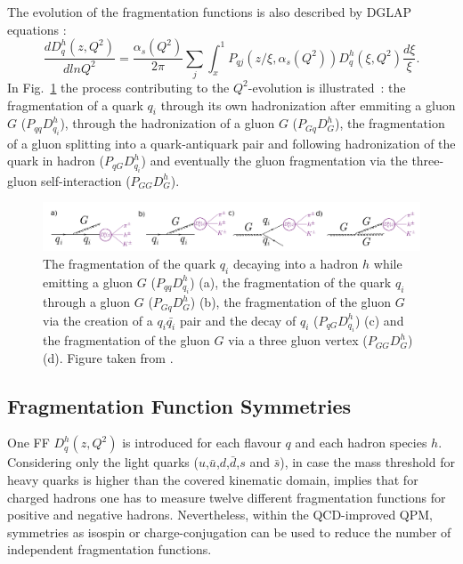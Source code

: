 The evolution of the fragmentation functions is also described by DGLAP equations \cite{Dokshitser, GL1, GL2, AP} :
%
\begin{equation}
  \frac{dD_q^h(z,Q^2)}{dlnQ^2} = \frac{\alpha_s(Q^2)}{2\pi}\sum\limits_j\int_{x}^{1}P_{qj}\left(z/\xi,\alpha_s(Q^2)\right)D_q^h(\xi,Q^2)\frac{d\xi}{\xi}.
\end{equation}
%
In Fig.~\ref{pic:QuarkFrag} the process contributing to the $Q^2$-evolution is illustrated~: the fragmentation of a quark $q_i$ through its own hadronization after emmiting a gluon $G$ ($P_{qq}D_{q_i}^h$), through the hadronization of a gluon $G$ ($P_{Gq}D_{G}^h$), the fragmentation of a gluon splitting into a quark-antiquark pair and following hadronization of the quark in hadron ($P_{qG}D_{q_i}^h$) and eventually the gluon fragmentation via the three-gluon self-interaction ($P_{GG}D_{G}^h$).

\begin{figure}[!h]
  \centering
	\includegraphics[scale=0.45]{./gfx/QuarkFrag.png}
	\caption{The fragmentation of the quark $q_i$ decaying into a hadron $h$ while emitting a gluon $G$ ($P_{qq}D^h_{q_{i}}$) (a), the fragmentation of the quark $q_i$ through a gluon $G$ ($P_{Gq}D^h_{G}$) (b), the fragmentation of the gluon $G$ via the creation of a $q_i \bar{q_i}$ pair and the decay of $q_i$ ($P_{qG}D^h_{q_{i}}$) (c) and the fragmentation of the gluon $G$ via a three gluon vertex ($P_{GG}D^h_{G}$) (d). Figure taken from \cite{Uematsu}.}
	\label{pic:QuarkFrag}
\end{figure}

\subsection{Fragmentation Function Symmetries}

One FF $D^h_q(z,Q^2)$ is introduced for each flavour $q$ and each hadron species $h$. Considering only the light quarks ($u$,$\bar{u}$,$d$,$\bar{d}$,$s$ and $\bar{s}$), in case the mass threshold for heavy quarks is higher than the covered kinematic domain, implies that for charged hadrons one has to measure twelve different fragmentation functions for positive and negative hadrons. Nevertheless, within the QCD-improved QPM, symmetries as isospin or charge-conjugation can be used to reduce the number of independent fragmentation functions.


